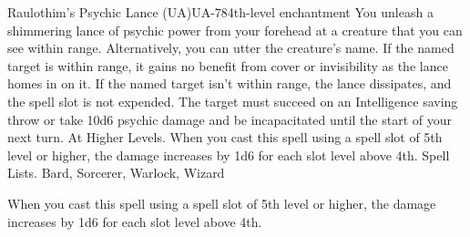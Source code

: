 \begin{spell}{Raulothim's Psychic Lance (UA)}{UA-78}{4th-level enchantment}
{
}
You unleash a shimmering lance of psychic power from your forehead at a creature that you can see within range. Alternatively, you can utter the creature’s name. If the named target is within range, it gains no benefit from cover or invisibility as the lance homes in on it. If the named target isn’t within range, the lance dissipates, and the spell slot is not expended.
The target must succeed on an Intelligence saving throw or take 10d6 psychic damage and be incapacitated until the start of your next turn.
At Higher Levels. When you cast this spell using a spell slot of 5th level or higher, the damage increases by 1d6 for each slot level above 4th.
Spell Lists. Bard, Sorcerer, Warlock, Wizard

 When you cast this spell using a spell slot of 5th level or higher, the damage increases by 1d6 for each slot level above 4th.
\end{spell}

